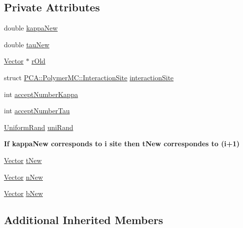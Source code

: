 \subsection*{Private Attributes}
\begin{DoxyCompactItemize}
\item 
double \hyperlink{class_p_c_a_1_1_polymer_m_c_a6771be27571e5c106546eb5225edec05}{kappa\+New}
\item 
double \hyperlink{class_p_c_a_1_1_polymer_m_c_a6400a8ec5f791281122167837d6e4d7d}{tau\+New}
\item 
\hyperlink{class_p_c_a_1_1_vector}{Vector} $\ast$ \hyperlink{class_p_c_a_1_1_polymer_m_c_a6144923e16ec4e3086f92516d8a9117b}{r\+Old}
\item 
struct \hyperlink{struct_p_c_a_1_1_polymer_m_c_1_1_interaction_site}{P\+C\+A\+::\+Polymer\+M\+C\+::\+Interaction\+Site} \hyperlink{class_p_c_a_1_1_polymer_m_c_ac4bbb885c9b1953dd3bd2fbf1656822e}{interaction\+Site}
\item 
int \hyperlink{class_p_c_a_1_1_polymer_m_c_adc7d93c4f0f568dd5fd9b74064e0cd88}{accept\+Number\+Kappa}
\item 
int \hyperlink{class_p_c_a_1_1_polymer_m_c_a537709e4e856390abc7f511de2cf4c58}{accept\+Number\+Tau}
\item 
\hyperlink{class_p_c_a_1_1_uniform_rand}{Uniform\+Rand} \hyperlink{class_p_c_a_1_1_polymer_m_c_ac503a4c28f8c36289d34036ce1ebc0b2}{uni\+Rand}
\end{DoxyCompactItemize}
\begin{Indent}{\bf If kappa\+New corresponds to i site then t\+New correspondes to (i+1)}\par
\begin{DoxyCompactItemize}
\item 
\hyperlink{class_p_c_a_1_1_vector}{Vector} \hyperlink{class_p_c_a_1_1_polymer_m_c_a1220187032c23f9fd2d78886fd1815b3}{t\+New}
\item 
\hyperlink{class_p_c_a_1_1_vector}{Vector} \hyperlink{class_p_c_a_1_1_polymer_m_c_a5e493ca12a3eba2f1658ac1cccba3d56}{n\+New}
\item 
\hyperlink{class_p_c_a_1_1_vector}{Vector} \hyperlink{class_p_c_a_1_1_polymer_m_c_a69019643d3a1fd92b8c77647bb4a91d6}{b\+New}
\end{DoxyCompactItemize}
\end{Indent}
\subsection*{Additional Inherited Members}


